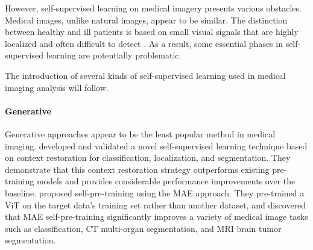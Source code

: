 \documentclass[11pt,titlepage,openright]{book}
\begin{document}
However, self-supervised learning on medical imagery presents various obstacles. Medical images, unlike natural images, appear to be similar. The distinction between healthy and ill patients is based on small visual signals that are highly localized and often difficult to detect \citep{huang2023self}. As a result, some essential phases in self-supervised learning are potentially problematic.

The introduction of several kinds of self-supervised learning used in medical imaging analysis will follow.

\paragraph{\textbf{Generative}} Generative approaches appear to be the least popular method in medical imaging. \cite{chen2019self} developed and validated a novel self-supervised learning technique based on context restoration for classification, localization, and segmentation. They demonstrate that this context restoration strategy outperforms existing pre-training models and provides considerable performance improvements over the baseline. \cite{zhou2023self} proposed self-pre-training using the MAE \citep{he2022masked} approach. They pre-trained a ViT on the target data's training set rather than another dataset, and discovered that MAE self-pre-training significantly improves a variety of medical image tasks such as classification, CT multi-organ segmentation, and MRI brain tumor segmentation.
\end{document}

